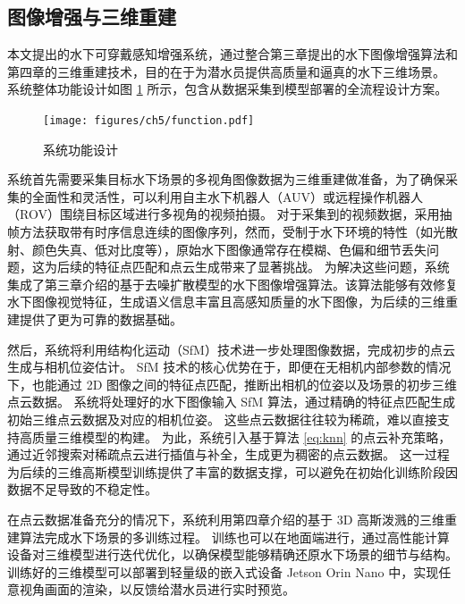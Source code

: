 \subsection{图像增强与三维重建}
本文提出的水下可穿戴感知增强系统，通过整合第三章提出的水下图像增强算法和第四章的三维重建技术，目的在于为潜水员提供高质量和逼真的水下三维场景。
系统整体功能设计如图 \ref{img:function} 所示，包含从数据采集到模型部署的全流程设计方案。
\begin{figure}[ht]
    \centering
    \vspace{0.5cm}
    \texttt{[image: figures/ch5/function.pdf]}
    \caption{系统功能设计}
    \label{img:function}
\end{figure}

系统首先需要采集目标水下场景的多视角图像数据为三维重建做准备，为了确保采集的全面性和灵活性，可以利用自主水下机器人（AUV）或远程操作机器人（ROV）围绕目标区域进行多视角的视频拍摄。
对于采集到的视频数据，采用抽帧方法获取带有时序信息连续的图像序列，然而，受制于水下环境的特性（如光散射、颜色失真、低对比度等），原始水下图像通常存在模糊、色偏和细节丢失问题，这为后续的特征点匹配和点云生成带来了显著挑战。
为解决这些问题，系统集成了第三章介绍的基于去噪扩散模型的水下图像增强算法。该算法能够有效修复水下图像视觉特征，生成语义信息丰富且高感知质量的水下图像，为后续的三维重建提供了更为可靠的数据基础。

然后，系统将利用结构化运动（SfM）技术进一步处理图像数据，完成初步的点云生成与相机位姿估计。
SfM 技术的核心优势在于，即便在无相机内部参数的情况下，也能通过 2D 图像之间的特征点匹配，推断出相机的位姿以及场景的初步三维点云数据。
系统将处理好的水下图像输入 SfM 算法，通过精确的特征点匹配生成初始三维点云数据及对应的相机位姿。
这些点云数据往往较为稀疏，难以直接支持高质量三维模型的构建。
为此，系统引入基于算法 \ref{eq:knn} 的点云补充策略，通过近邻搜索对稀疏点云进行插值与补全，生成更为稠密的点云数据。
这一过程为后续的三维高斯模型训练提供了丰富的数据支撑，可以避免在初始化训练阶段因数据不足导致的不稳定性。

在点云数据准备充分的情况下，系统利用第四章介绍的基于 3D 高斯泼溅的三维重建算法完成水下场景的多训练过程。
训练也可以在地面端进行，通过高性能计算设备对三维模型进行迭代优化，以确保模型能够精确还原水下场景的细节与结构。
训练好的三维模型可以部署到轻量级的嵌入式设备 Jetson Orin Nano 中，实现任意视角画面的渲染，以反馈给潜水员进行实时预览。

